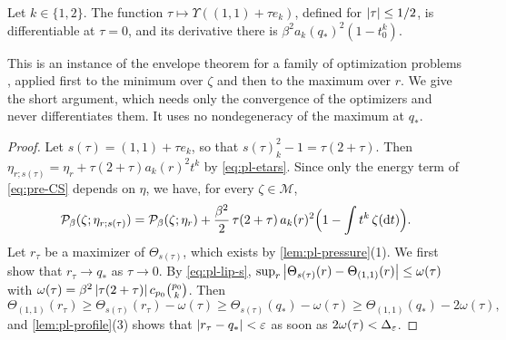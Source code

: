 \begin{lemma}\label{lem:pl-envelope}
Let $k\in\{1,2\}$. The function $\tau\mapsto\Upsilon((1,1)+\tau e_k)$, defined for $\left|\tau\right|\le1/2$, is differentiable at $\tau=0$, and its derivative there is $\beta^2a_k(q_*)^2(1-t_0^k)$.
\end{lemma}

This is an instance of the envelope theorem for a family of optimization problems \cite[Theorem~1 and Corollary~4]{MilgromSegal2002}, applied first to the minimum over $\zeta$ and then to the maximum over $r$. We give the short argument, which needs only the convergence of the optimizers and never differentiates them. It uses no nondegeneracy of the maximum at $q_*$.

\begin{proof}
Let $s(\tau)=(1,1)+\tau e_k$, so that $s(\tau)_k^2-1=\tau(2+\tau)$. Then $\eta_{r;s(\tau)}=\eta_r+\tau(2+\tau)a_k(r)^2t^k$ by \eqref{eq:pl-etars}. Since only the energy term of \eqref{eq:pre-CS} depends on $\eta$, we have, for every $\zeta\in\mathscr M$,
\begin{equation}\label{eq:pl-cs-shift}
\mathcal P_\beta(\zeta;\eta_{r;s(\tau)})=\mathcal P_\beta(\zeta;\eta_r)+\frac{\beta^2}2\,\tau(2+\tau)\,a_k(r)^2\Bigl(1-\int t^k\,\zeta(\mathrm dt)\Bigr).
\end{equation}
Let $r_\tau$ be a maximizer of $\Theta_{s(\tau)}$, which exists by \cref{lem:pl-pressure}(1). We first show that $r_\tau\to q_*$ as $\tau\to0$. By \eqref{eq:pl-lip-s}, $\sup_r\left|\Theta_{s(\tau)}(r)-\Theta_{(1,1)}(r)\right|\le\omega(\tau)$ with $\omega(\tau)=\beta^2\left|\tau(2+\tau)\right|c_{p_0}\binom{p_0}k$. Then
\[
\Theta_{(1,1)}(r_\tau)\ge\Theta_{s(\tau)}(r_\tau)-\omega(\tau)\ge\Theta_{s(\tau)}(q_*)-\omega(\tau)\ge\Theta_{(1,1)}(q_*)-2\omega(\tau),
\]
and \cref{lem:pl-profile}(3) shows that $\left|r_\tau-q_*\right|<\varepsilon$ as soon as $2\omega(\tau)<\Delta_\varepsilon$.


\end{proof}
